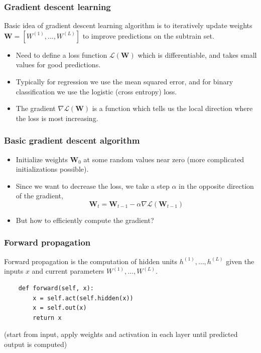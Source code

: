 \documentclass{beamer}
\begin{document}
\begin{frame}
  \frametitle{Gradient descent learning}
  Basic idea of gradient descent learning algorithm is to iteratively
  update weights $\mathbf W = [W^{(1)}, \dots, W^{(L)} ]$ to improve
  predictions on the subtrain set.
  \begin{itemize}
  \item Need to define a loss function
    $\mathcal L(\mathbf W)$ which is differentiable, and
    takes small values for good predictions.
  \item Typically for regression we use the mean squared error, and
    for binary classification we use the logistic (cross entropy)
    loss.
  \item The gradient $\nabla \mathcal L(\mathbf W)$ is a
    function which tells us the local direction where the loss is most
    increasing.
  \end{itemize}
\end{frame}

\begin{frame}
  \frametitle{Basic gradient descent algorithm}
  \begin{itemize}
  \item Initialize weights $\mathbf W_0$ at some random values near
    zero (more complicated initializations possible).
  \item Since we want to decrease the loss, we take a step $\alpha$ in the
    opposite direction of the gradient,
  $$
\mathbf W_t = \mathbf W_{t-1} - \alpha \nabla \mathcal L(\mathbf W_{t-1})
$$
\item But how to efficiently compute the gradient?
  \end{itemize}
\end{frame}

\begin{frame}[fragile]
  \frametitle{Forward propagation}
Forward propagation is the computation of hidden units
$h^{(1)},\dots,h^{(L)}$ given the inputs $x$ and current parameters
$W^{(1)},\dots,W^{(L)}$.
\begin{verbatim}
    def forward(self, x):
        x = self.act(self.hidden(x))
        x = self.out(x)
        return x
\end{verbatim}
(start from input, apply weights and activation in each layer until
predicted output is computed)
\end{frame}
\end{document}
